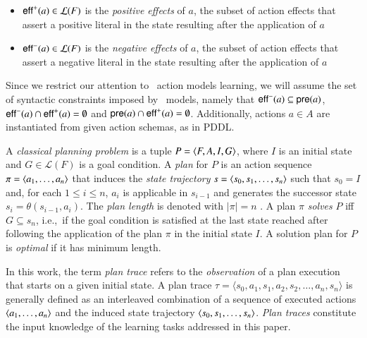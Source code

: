 \begin{itemize}
\item \textcolor[rgb]{1.00,0.00,0.00}{$\mathsf{eff}^+(a)\in\mathcal{L}(F)$ is the {\em positive effects} of $a$, the subset of action effects that assert a positive literal in the state resulting after the application of $a$}
\item \textcolor[rgb]{1.00,0.00,0.00}{$\mathsf{eff}^-(a)\in\mathcal{L}(F)$ is the {\em negative effects} of $a$, the subset of action effects that assert a negative literal in the state resulting after the application of $a$}
\end{itemize}

\textcolor[rgb]{1.00,0.00,0.00}{Since we restrict our attention to \strips\ action models learning, we will assume the set of syntactic constraints imposed by \strips\ models, namely }that $\mathsf{eff}^-(a)\subseteq \mathsf{pre}(a)$, $\mathsf{eff}^-(a)\cap \mathsf{eff}^+(a)=\emptyset$ and $\mathsf{pre}(a)\cap \mathsf{eff}^+(a)=\emptyset$. Additionally, actions $a\in A$ are instantiated from given action schemas, as in PDDL.


A {\em classical planning problem} is a tuple $P={\langle F,A,I,G \rangle}$, where $I$ is an initial state and $G\in\mathcal{L}(F)$ is a goal condition. A {\em plan} for $P$ is an action sequence $\pi={\langle a_1, \ldots, a_n \rangle}$ that induces the {\em state trajectory} $s={\langle s_0, s_1, \ldots, s_n \rangle}$ such that $s_0=I$ and, for each {\small $1\leq i\leq n$}, $a_i$ is applicable in $s_{i-1}$ and generates the successor state $s_i=\theta(s_{i-1},a_i)$. The {\em plan length} is denoted with $|\pi|=n$ . A plan $\pi$ {\em solves} $P$ iff $G\subseteq s_n$, i.e.,~if the goal condition is satisfied at the last state reached after following the application of the plan $\pi$ in the initial state $I$. A solution plan for $P$ is {\em optimal} if it has minimum length.

In this work, the term \emph{plan trace} refers to the \emph{observation} of a plan execution that starts on a given initial state. A plan trace $\tau = \langle s_0, a_1, s_1, a_2, s_2, \ldots, a_n, s_n \rangle$ is generally defined as an interleaved combination of a sequence of executed actions ${\langle a_1, \ldots, a_n \rangle}$ and the induced state trajectory ${\langle s_0, s_1, \ldots, s_n \rangle}$. \emph{Plan traces} constitute the input knowledge of the learning tasks addressed in this paper.

